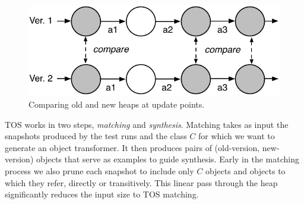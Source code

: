 \documentclass[natbib,10pt]{sigplanconf}
\newcommand{\TOS}{TOS\xspace}
\begin{document}

\begin{figure}
\begin{center}
\includegraphics[scale=0.55]{comparing-heaps-two-runs}
\end{center}
\caption{\label{fig:run-both}Comparing old and new heaps at update points.}
\end{figure}

\TOS works in two steps, \emph{matching} and \emph{synthesis}.
Matching takes as input the snapshots produced by the test runs
and the class $C$ for which we want to generate an object transformer.
It then produces pairs of (old-version, new-version) objects that serve
as examples to guide synthesis.  Early in the matching process we also
prune each snapshot to include only $C$ objects and objects to which they
refer, directly or transitively. This
linear pass through the heap significantly reduces the input size to
\TOS matching.
\end{document}
